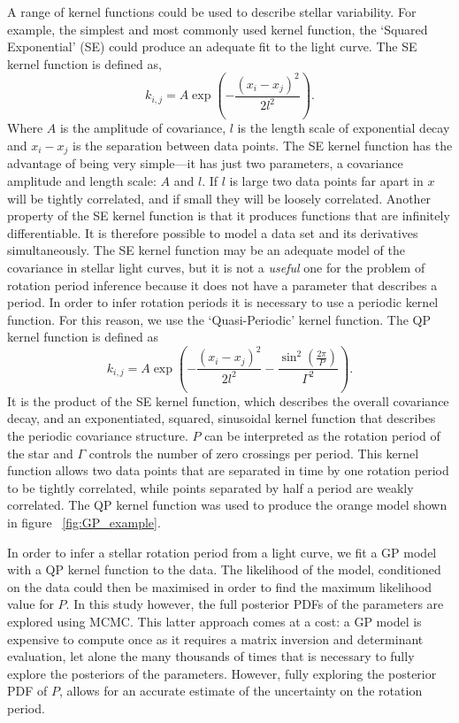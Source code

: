 A range of kernel functions could be used to describe stellar variability.
For example, the simplest and most commonly used kernel function, the
`Squared Exponential' (SE) could produce an adequate fit to the 
light curve.
The SE kernel function is defined as,
\begin{equation}
k_{i,j} = A \exp \left(-\frac{(x_i - x_j)^2}{2l^2} \right).
\end{equation}
\label{eq:SE}
Where $A$ is the amplitude of covariance, $l$ is the length scale of
exponential decay and $x_i-x_j$ is the separation between data points.
The SE kernel function has the advantage of being very simple---it has just
two parameters, a covariance amplitude and length scale: $A$ and $l$.
If $l$ is large two data points far apart in $x$ will be tightly correlated,
and if small they will be loosely correlated.
Another property of the SE kernel function is that it produces functions that
are infinitely differentiable.
It is therefore possible to model a data set and its derivatives
simultaneously.
The SE kernel function may be an adequate model of the covariance in stellar
light curves, but it is not a {\it useful} one for the problem of rotation
period inference because it does not have a parameter that describes a period.
In order to infer rotation periods it is necessary to use a periodic kernel
function.
For this reason, we use the `Quasi-Periodic' kernel function.
The QP kernel function is defined as
\begin{equation}
k_{i,j} = A \exp \left(-\frac{(x_i - x_j)^2}{2l^2} -
\frac{\sin^2(\frac{2\pi}{P})}{\Gamma^2} \right).
\end{equation}
\label{eq:QP}
It is the product of the SE kernel function, which describes the overall
covariance decay, and an exponentiated, squared, sinusoidal kernel function
that describes the periodic covariance structure.
$P$ can be interpreted as the rotation period of the star and $\Gamma$
controls the number of zero crossings per period.
This kernel function allows two data points that are separated in time by one
rotation period to be tightly correlated, while points separated by half a
period are weakly correlated.
The QP kernel function was used to produce the orange model shown in figure
~\ref{fig:GP_example}.

In order to infer a stellar rotation period from a light curve, we fit a GP
model with a QP kernel function to the data.
The likelihood of the model, conditioned on the data could then be maximised
in order to find the maximum likelihood value for $P$.
In this study however, the full posterior PDFs of the parameters are explored
using MCMC.
This latter approach comes at a cost: a GP model is expensive to compute once
as it requires a matrix inversion and determinant evaluation, let alone the
many thousands of times that is necessary to fully explore the posteriors of
the parameters.
However, fully exploring the posterior PDF of $P$, allows for an accurate
estimate of the uncertainty on the rotation period.

